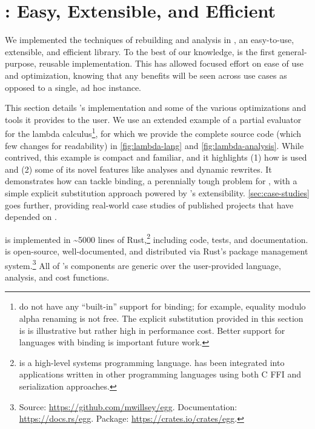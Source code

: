 \section{\egg: Easy, Extensible, and Efficient \Egraphs}

\label{sec:egg}
\label{sec:impl}
\label{sec:lambda}

We implemented the techniques of rebuilding and \eclass analysis in \egg,
  an easy-to-use, extensible, and efficient \egraph library.
To the best of our knowledge,
  \egg is the first general-purpose, reusable \egraph implementation.
This has allowed focused effort on ease of use and optimization,
  knowing that any benefits will
  be seen across use cases as opposed to a single, ad hoc instance.

This section details \egg's implementation and some of the various
  optimizations and tools it provides to the user.
We use an extended example of a partial evaluator for the lambda calculus\footnote{
  \Egraphs do not have any ``built-in'' support for binding;
  for example, equality modulo alpha renaming is not free.
  The explicit substitution provided in this section is is illustrative but rather high in performance cost.
  Better support for languages with binding is important future work.
},
  for which we provide the complete source code (which few changes for readability)
  in \autoref{fig:lambda-lang} and \autoref{fig:lambda-analysis}.
While contrived, this example is compact and familiar, and it highlights
  (1) how \egg is used and (2) some of its novel features like
  \eclass analyses and dynamic rewrites.
It demonstrates how \egg can tackle binding,
  a perennially tough problem for \egraphs,
  with a simple explicit substitution approach
  powered by \egg's extensibility.
\autoref{sec:case-studies} goes further, providing real-world case studies of
  published projects that have depended on \egg.

\egg is implemented in \textasciitilde{}5000 lines of Rust,\footnote
{
  \citeauthor{rust} is a high-level systems programming language.
  \egg has been integrated into applications written in other
  programming languages using both C FFI and serialization approaches.
}
including code, tests, and documentation.
\egg is open-source, well-documented, and distributed via Rust's package
  management system.\footnote{
  Source: \url{https://github.com/mwillsey/egg}.
  Documentation: \url{https://docs.rs/egg}.
  Package: \url{https://crates.io/crates/egg}.
}
All of \egg's components are generic over the
  user-provided language, analysis, and cost functions.

